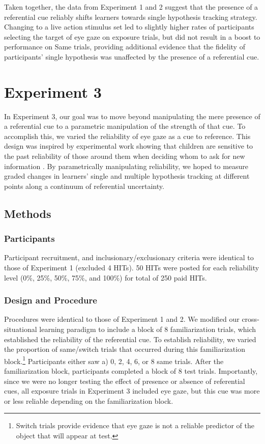 \documentclass[10pt,letterpaper]{article}
\begin{document}
Taken together, the data from Experiment 1 and 2 suggest that the presence of a referential cue reliably shifts learners towards single hypothesis tracking strategy. Changing to a live action stimulus set led to slightly higher rates of participants selecting the target of eye gaze on exposure trials, but did not result in a boost to performance on Same trials, providing additional evidence that the fidelity of participants' single hypothesis was unaffected by the presence of a referential cue.


\section{Experiment 3}

In Experiment 3, our goal was to move beyond manipulating the mere presence of a referential cue to a parametric manipulation of the strength of that cue. To accomplish this, we varied the reliability of eye gaze as a cue to reference. This design was inspired by experimental work showing that children are sensitive to the past reliability of those around them when deciding whom to ask for new information \cite{koenig2004trust}. By parametrically manipulating reliability, we hoped to measure graded changes in learners' single and multiple hypothesis tracking at different points along a continuum of referential uncertainty.

\subsection{Methods}

\subsubsection{Participants}
Participant recruitment, and inclusionary/exclusionary criteria were identical to those of Experiment 1 (excluded 4 HITs). 50 HITs were posted for each reliability level (0\%, 25\%, 50\%, 75\%, and 100\%) for total of 250 paid HITs.  

\subsubsection{Design and Procedure}

Procedures were identical to those of Experiment 1 and 2. We modified our cross-situational learning paradigm to include a block of 8 familiarization trials, which established the reliability of the referential cue. To establish reliability, we varied the proportion of same/switch trials that occurred during this familiarization block.\footnote{Switch trials provide evidence that eye gaze is not a reliable predictor of the object that will appear at test.} Participants either saw a) 0, 2, 4, 6, or 8 same trials. After the familiarization block, participants completed a block of 8 test trials. Importantly, since we were no longer testing the effect of presence or absence of referential cues, all exposure trials in Experiment 3 included eye gaze, but this cue was more or less reliable depending on the familiarization block.
\end{document}
